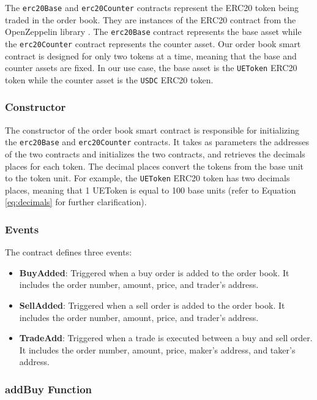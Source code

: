 The \texttt{erc20Base} and \texttt{erc20Counter} contracts represent the ERC20 token being traded in the order book. They are
instances of the ERC20 contract from the OpenZeppelin library \cite{openzeppelin_erc20}. The \texttt{erc20Base} contract represents
the base asset while the \texttt{erc20Counter} contract represents the counter asset. Our order book smart contract is designed
for only two tokens at a time, meaning that the base and counter assets are fixed. In our use case, the base asset is the \texttt{UEToken}
ERC20 token while the counter asset is the \texttt{USDC} ERC20 token.


\subsubsection{Constructor}


The constructor of the order book smart contract is responsible for initializing the \texttt{erc20Base} and \texttt{erc20Counter}
contracts. It takes as parameters the addresses of the two contracts and initializes the two contracts, and retrieves the decimals
places for each token. The decimal places convert the tokens from the base unit to the token unit. For example,
the \texttt{UEToken} ERC20 token has two decimals places, meaning that 1 UEToken is equal to 100 base units (refer to Equation \ref{eq:decimals}
for further clarification).

\subsubsection{Events}


The contract defines three events:


\begin{itemize}
    \item \textbf{BuyAdded}: Triggered when a buy order is added to the order book. It includes the order number, amount, price, and trader's address.
    \item \textbf{SellAdded}: Triggered when a sell order is added to the order book. It includes the order number, amount, price, and trader's address.
    \item \textbf{TradeAdd}: Triggered when a trade is executed between a buy and sell order. It includes the order number, amount, price, maker's address, and taker's address.
\end{itemize}


\subsubsection{addBuy Function}


